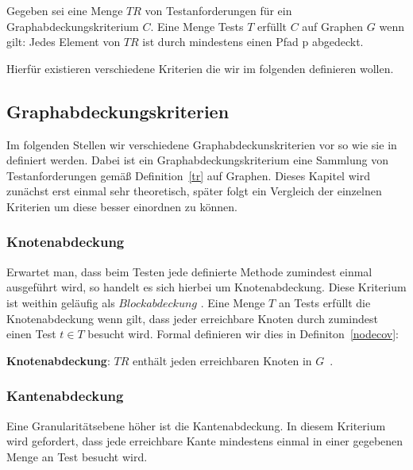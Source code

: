 \begin{definition}
    Gegeben sei eine Menge $TR$ von Testanforderungen für ein Graphabdeckungskriterium $C$.
    Eine Menge Tests $T$ erfüllt $C$ auf Graphen $G$ wenn gilt: Jedes Element von $TR$ ist durch mindestens einen Pfad p abgedeckt.
    \cite[vgl. Def. 2.32]{software-testing}
    \label{graphcov}
\end{definition}

Hierfür existieren verschiedene Kriterien die wir im folgenden definieren wollen.

\subsection{Graphabdeckungskriterien}

Im folgenden Stellen wir verschiedene Graphabdeckunskriterien vor so wie sie in~\cite{software-testing} definiert werden.
Dabei ist ein Graphabdeckungskriterium eine Sammlung von Testanforderungen gemäß Definition~\ref{tr} auf Graphen.
Dieses Kapitel wird zunächst erst einmal sehr theoretisch, später folgt ein Vergleich der einzelnen Kriterien um diese besser einordnen zu können.

\subsubsection{Knotenabdeckung}

Erwartet man, dass beim Testen jede definierte Methode zumindest einmal ausgeführt wird, so handelt es sich hierbei um Knotenabdeckung.
Diese Kriterium ist weithin geläufig als $Blockabdeckung$ \cite[vgl. 2.2.1]{software-testing}.
Eine Menge $T$ an Tests erfüllt die Knotenabdeckung wenn gilt, dass jeder erreichbare Knoten durch zumindest einen Test $t \in T$ besucht wird.
Formal definieren wir dies in Definiton~\ref{nodecov}: 

\begin{definition}
    \textbf{Knotenabdeckung}: $TR$ enthält jeden erreichbaren Knoten in $G$~\cite[vgl. Criterion 2.1]{software-testing}.
    \label{nodecov}
\end{definition}


\subsubsection{Kantenabdeckung}

Eine Granularitätsebene höher ist die Kantenabdeckung.
In diesem Kriterium wird gefordert, dass jede erreichbare Kante mindestens einmal in einer gegebenen Menge an Test besucht wird.

